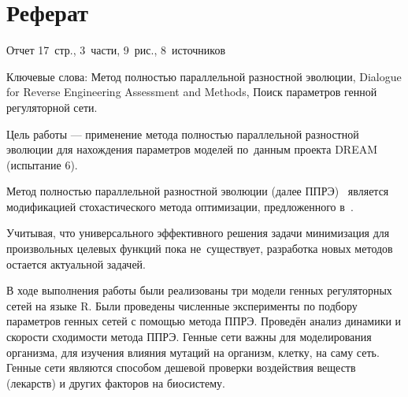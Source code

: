\chapter*{Реферат}							%

Отчет 17~стр., 3~части, 9~рис., 8~источников

Ключевые слова: Метод полностью параллельной разностной эволюции, Dialogue for 
Reverse Engineering Assessment and Methods, Поиск параметров генной регуляторной 
сети.

Цель работы — применение метода полностью параллельной разностной эволюции для 
нахождения параметров моделей по~данным проекта DREAM (испытание 6).

Метод полностью параллельной разностной эволюции (далее ППРЭ)~\cite{bib2,bib5} 
является модификацией стохастического метода оптимизации, предложенного 
в~\cite{bib1}. 

Учитывая, что универсального эффективного решения задачи минимизация для 
произвольных целевых функций пока не~существует, разработка новых методов 
остается актуальной задачей. 

В ходе выполнения работы были реализованы три модели генных регуляторных сетей
на языке R. Были проведены численные эксперименты по подбору параметров генных
сетей с помощью метода ППРЭ. Проведён анализ динамики и скорости сходимости 
метода ППРЭ. Генные сети важны для моделирования организма, для изучения влияния
мутаций на организм, клетку, на саму сеть. Генные сети являются способом дешевой
проверки воздействия веществ (лекарств) и других факторов на биосистему.


\clearpage
